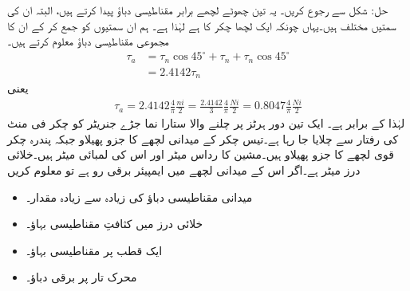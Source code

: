 حل: شکل   سے رجوع کریں۔ یہ تین چھوٹے لچھے برابر مقناطیسی دباؤ  پیدا کرتے ہیں، البتہ ان کی سمتیں مختلف ہیں۔یہاں چونکہ ایک لچھا   چکر کا ہے لہٰذا  ہے۔ ہم ان سمتیوں کو جمع کر کے ان کا مجموعی مقناطیسی دباؤ  معلوم کرتے ہیں۔
\begin{align*}
\tau_a&=\tau_n \cos 45^\circ+\tau_n+\tau_n \cos 45^\circ\\
&=2.4142 \tau_n
\end{align*}
یعنی
\begin{align*}
\tau_a=2.4142 \frac{4}{\pi}\frac{ni}{2}=\frac{2.4142}{3} \frac{4}{\pi}\frac{N i}{2}=0.8047 \frac{4}{\pi}\frac{N i}{2}
\end{align*}
لہٰذا  کے برابر ہے۔
%
ایک تین دور  ہرٹز پر چلنے والا ستارا نما جڑے جنریٹر کو   چکر فی منٹ کی رفتار سے چلایا جا رہا ہے۔تیس چکر کے میدانی لچھے  کا جزو پھیلاو  جبکہ پندرہ چکر قوی لچھے کا جزو پھیلاو  ہیں۔مشین کا رداس  میٹر اور اس  کی لمبائی  میٹر ہیں۔خلائی درز  میٹر ہے۔اگر اس کے میدانی لچھے میں   ایمپیئر برقی رو ہے تو معلوم کریں
\begin{itemize}
\item
میدانی مقناطیسی دباؤ کی زیادہ سے زیادہ مقدار۔
\item
خلائی درز میں کثافتِ مقناطیسی بہاؤ۔
\item
ایک قطب پر مقناطیسی بہاؤ۔
\item
محرک تار پر برقی دباؤ۔
\end{itemize}


